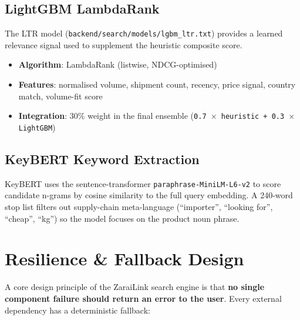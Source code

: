 \documentclass[12pt,a4paper]{article}
\begin{document}
\subsection{LightGBM LambdaRank}

The LTR model (\texttt{backend/search/models/lgbm\_ltr.txt}) provides a learned
relevance signal used to supplement the heuristic composite score.

\begin{itemize}
  \item \textbf{Algorithm}: LambdaRank (listwise, NDCG-optimised)
  \item \textbf{Features}: normalised volume, shipment count, recency, price signal,
        country match, volume-fit score
  \item \textbf{Integration}: 30\% weight in the final ensemble
        (\texttt{0.7 $\times$ heuristic + 0.3 $\times$ LightGBM})
\end{itemize}

\subsection{KeyBERT Keyword Extraction}

KeyBERT uses the sentence-transformer \texttt{paraphrase-MiniLM-L6-v2} to score
candidate n-grams by cosine similarity to the full query embedding.  A 240-word stop
list filters out supply-chain meta-language (``importer'', ``looking for'', ``cheap'',
``kg'') so the model focuses on the product noun phrase.

\newpage
\section{Resilience \& Fallback Design}
\label{sec:resilience}

A core design principle of the ZaraiLink search engine is that \textbf{no single
component failure should return an error to the user}.  Every external dependency has a
deterministic fallback:
\end{document}
